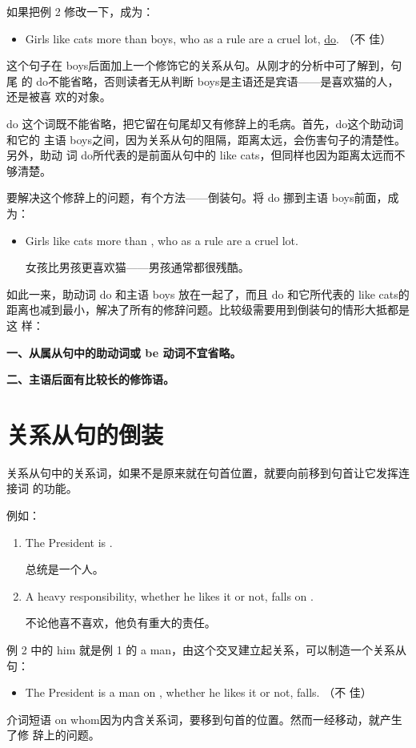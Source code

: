 如果把例 2 修改一下，成为：
\begin{itemize}
\item Girls like cats more than boys, who as a rule are a cruel lot, \ul{do}. （不
  佳）
\end{itemize}
这个句子在 boys后面加上一个修饰它的关系从句。从刚才的分析中可了解到，句尾
的 do不能省略，否则读者无从判断 boys是主语还是宾语——是喜欢猫的人，还是被喜
欢的对象。

do 这个词既不能省略，把它留在句尾却又有修辞上的毛病。首先，do这个助动词和它的
主语 boys之间，因为关系从句的阻隔，距离太远，会伤害句子的清楚性。另外，助动
词 do所代表的是前面从句中的 like cats，但同样也因为距离太远而不够清楚。

要解决这个修辞上的问题，有个方法——倒装句。将 do 挪到主语 boys前面，成为：
\begin{itemize}
\item Girls like cats more than , who as a rule are a cruel lot.

  女孩比男孩更喜欢猫——男孩通常都很残酷。
\end{itemize}

如此一来，助动词 do 和主语 boys 放在一起了，而且 do 和它所代表的 like cats的
距离也减到最小，解决了所有的修辞问题。比较级需要用到倒装句的情形大抵都是这
样：

\textbf{一、从属从句中的助动词或 be 动词不宜省略。}

\textbf{二、主语后面有比较长的修饰语。}

\section{关系从句的倒装}

关系从句中的关系词，如果不是原来就在句首位置，就要向前移到句首让它发挥连接词
的功能。

例如：
\begin{enumerate}
\item The President is .

  总统是一个人。
\item A heavy responsibility, whether he likes it or not, falls on .

  不论他喜不喜欢，他负有重大的责任。
\end{enumerate}
例 2 中的 him 就是例 1 的 a man，由这个交叉建立起关系，可以制造一个关系从句：
\begin{itemize}
\item The President is a man on  , whether he likes it or not, falls. （不
  佳）
\end{itemize}
介词短语 on whom因为内含关系词，要移到句首的位置。然而一经移动，就产生了修
辞上的问题。

